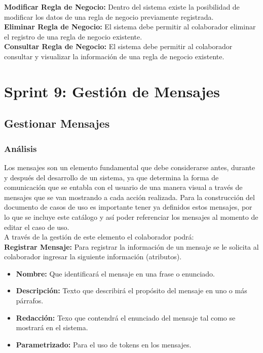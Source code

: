 \textbf {Modificar Regla de Negocio:}
Dentro del sistema existe la posibilidad de modificar los datos de una regla de negocio previamente registrada.\\

\textbf {Eliminar Regla de Negocio:} 
El sistema debe permitir al colaborador eliminar el registro de una regla de negocio existente.\\

\textbf {Consultar Regla de Negocio:} 
El sistema debe permitir al colaborador consultar y visualizar la información de una regla de negocio existente.\\

\section{Sprint 9: Gestión de Mensajes}

\subsection{Gestionar Mensajes}
\subsubsection {Análisis}
Los mensajes son un elemento fundamental que debe considerarse antes, durante y después del desarrollo de un sistema, ya que determina la forma de comunicación que se entabla con el usuario de una manera visual a través de mensajes que se van mostrando a cada acción realizada. Para la construcción del documento de casos de uso es importante tener ya definidos estos mensajes, por lo que se incluye este catálogo y así poder referenciar los mensajes al momento de editar el caso de uso.\\

A través de la gestión de este elemento el colaborador podrá:\\

\textbf {Registrar Mensaje:}
Para registrar la información de un mensaje se le solicita al colaborador ingresar la siguiente información (atributos).
\begin{itemize}
	\item \textbf{Nombre:} Que identificará el mensaje en una frase o enunciado.
	\item \textbf{Descripción:} Texto que describirá el propósito del mensaje en uno o más párrafos.
	\item \textbf{Redacción:} Texo que contendrá el enunciado del mensaje tal como se mostrará en el sistema.
	\item \textbf{Parametrizado:} Para el uso de tokens en los mensajes.\\
\end{itemize}

